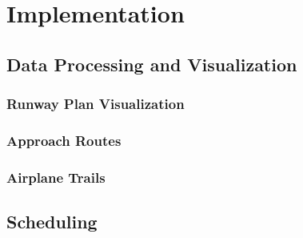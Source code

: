 \chapter{Implementation}


\section{Data Processing and Visualization}

\subsection{Runway Plan Visualization}


\subsection{Approach Routes}

\subsection{Airplane Trails}

\section{Scheduling}








\providecommand{\cmark}[2][]{\relax}
\providecommand{\cmark}[2][]{
  \begin{pgfonlayer}{marx}
    \node [nmark] at (c#2#1) {#2};
  \end{pgfonlayer}{marx}
  } 



